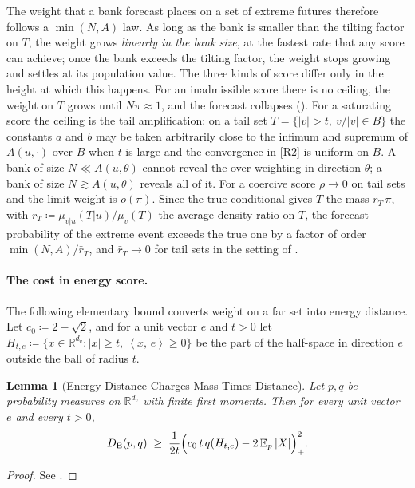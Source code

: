 \documentclass[11pt]{article}
\theoremstyle{plain}
\newtheorem{lemma}[theorem]{Lemma}
\theoremstyle{definition}
\theoremstyle{remark}
\newcommand{\RR}{\mathbb{R}}
\newcommand{\E}{\mathbb{E}}
\newcommand{\define}{\coloneqq}
\newcommand{\DE}{D_{\mathrm{E}}}
\newcommand{\IP}[2]{\left\langle #1,\, #2 \right\rangle}
\newcommand{\abs}[1]{\left\lvert #1 \right\rvert}
\begin{document}
The weight that a bank forecast places on a set of extreme futures therefore
follows a $\min(N,A)$ law. As long as the bank is smaller than the tilting
factor on $T$, the weight grows \emph{linearly in the bank size}, at the
fastest rate that any score can achieve; once the bank exceeds the tilting
factor, the weight stops growing and settles at its population value. The
three kinds of score differ only in the height at which this happens. For an
inadmissible score there is no ceiling, the weight on $T$ grows until
$N\pi\approx1$, and the forecast collapses (). For a
saturating score the ceiling is the tail amplification: on a tail set
$T=\{\abs{v}>t,\ v/\abs{v}\in B\}$ the constants $a$ and $b$ may be taken
arbitrarily close to the infimum and supremum of $A(u,\cdot)$ over $B$ when
$t$ is large and the convergence in \ref{R2} is uniform on $B$. A bank of
size $N\ll A(u,\theta)$ cannot reveal the over-weighting in direction
$\theta$; a bank of size $N\gtrsim A(u,\theta)$ reveals all of it. For a
coercive score $\rho\to0$ on tail sets and the limit weight is $o(\pi)$.
Since the true conditional gives $T$ the mass $\bar r_T\,\pi$, with
$\bar r_T\define\mu_{v\vert u}(T\vert u)/\mu_v(T)$ the average density ratio on
$T$, the forecast probability of the extreme event exceeds the true one by a
factor of order $\min(N,A)/\bar r_T$, and $\bar r_T\to0$ for tail sets in the
setting of .

\paragraph{The cost in energy score.}
The following elementary bound converts weight on a far set into energy
distance. Let $c_0\define2-\sqrt2$, and for a unit vector $e$ and $t>0$ let
$H_{t,e}\define\{x\in\RR^{d_v}:\abs{x}\ge t,\ \IP{x}{e}\ge0\}$ be the part of the
half-space in direction $e$ outside the ball of radius $t$.

\begin{lemma}[Energy Distance Charges Mass Times Distance]
 \label{lem:energytail}
 Let $p,q$ be probability measures on $\RR^{d_v}$ with finite first moments.
 Then for every unit vector $e$ and every $t>0$,
 \begin{equation}
  \DE(p,q)\;\ge\;\frac{1}{2t}\Bigl(c_0\,t\,q(H_{t,e})-2\,\E_{p}\abs{X}\Bigr)_{+}^{2}.
  \label{eq:energytail}
 \end{equation}
\end{lemma}
\begin{proof}
 See .
\end{proof}
\end{document}
